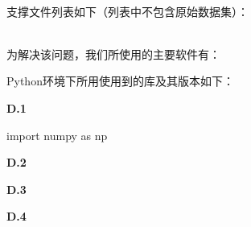 \documentclass{MathorCupModeling}
\begin{document}

\newpage
	~\\

	支撑文件列表如下（列表中不包含原始数据集）：

\newpage
	~\\

	为解决该问题，我们所使用的主要软件有：
	
	Python环境下所用使用到的库及其版本如下：

\newpage

\textbf{D.1 }
\begin{python}
import numpy as np
\end{python}
\newpage
\textbf{D.2 }

\newpage
\textbf{D.3 }

\newpage
\textbf{D.4 }
\end{document}
